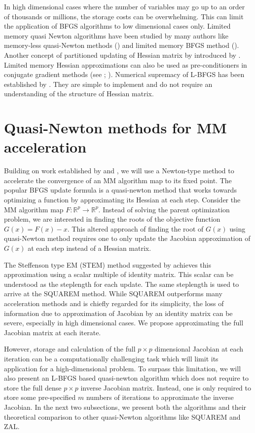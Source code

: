 \documentclass[12pt]{article}
\begin{document}
In high dimensional cases where the number of variables may go up to an order of thousands or millions, the storage costs can be overwhelming. This can limit the application of BFGS algorithms to low dimensional cases only. Limited memory quasi Newton algorithms have been studied by many authors like memory-less quasi-Newton methods (\cite{shanno1978conjugate}) and limited memory BFGS method (\cite{nocedal1980updating}). Another concept of partitioned updating of Hessian matrix by introduced by \cite{griewank1982partitioned}. Limited memory Hessian approximations can also be used as pre-conditioners in conjugate gradient methods (see \cite{buckley1983qn}; \cite{gill2003limited}). Numerical supremacy of L-BFGS has been established by \cite{liu1989limited}. They are simple to implement and do not require an understanding of the structure of Hessian matrix. \\


\section{Quasi-Newton methods for MM acceleration} \label{sec:qn}

Building on work established by \cite{varadhan2008simple} and \cite{zhou2011quasi}, we will use a Newton-type method to accelerate the convergence of an MM algorithm map to its fixed point. The popular BFGS update formula is a quasi-newton method that works towards optimizing a function by approximating its Hessian at each step. Consider the MM algorithm map $F: \mathbb{R}^p \to \mathbb{R}^p$. Instead of solving the parent optimization problem, we are interested in finding the roots of the objective function $G(x) = F(x) - x$. This altered approach of finding the root of $G(x)$ using quasi-Newton method requires one to only update the Jacobian approximation of $G(x)$ at each step instead of a Hessian matrix.

The Steffenson type EM (STEM) method suggested by \cite{varadhan2008simple} achieves this approximation using a scalar multiple of identity matrix. This scalar can be understood as the steplength for each update. The same steplength is used to arrive at the SQUAREM method. While SQUAREM outperforms many acceleration methods and is chiefly regarded for its simplicity, the loss of information due to approximation of Jacobian by an identity matrix can be severe, especially in high dimensional cases. We propose approximating the full Jacobian matrix at each iterate.

However, storage and calculation of the full $p \times p$ dimensional Jacobian at each iteration can be a computationally challenging task which will limit its application for a high-dimensional problem. To surpass this limitation, we will also present an L-BFGS based quasi-newton algorithm which does not require to store the full dense $p \times p$ inverse Jacobian matrix. Instead, one is only required to store some pre-specified $m$ numbers of iterations to approximate the inverse Jacobian. In the next two subsections, we present both the algorithms and their theoretical comparison to other quasi-Newton algorithms like SQUAREM and ZAL. 
\end{document}
